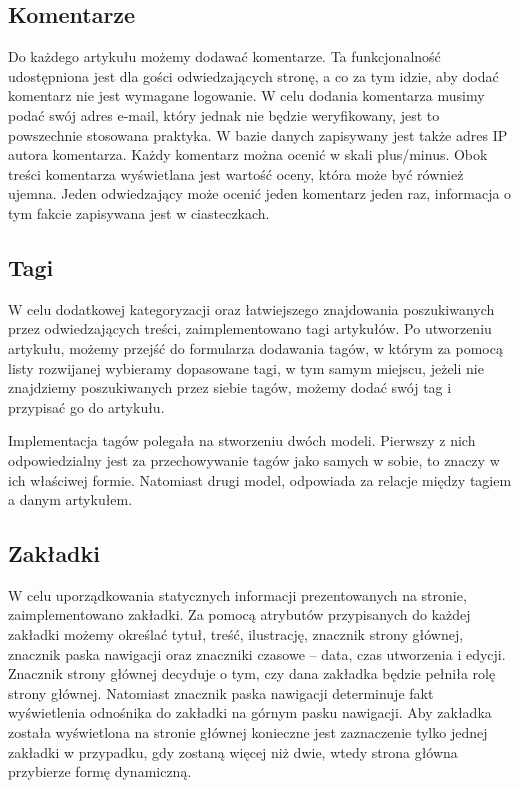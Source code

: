 \documentclass[openright]{xmgr}
\begin{document}
\subsection{Komentarze}
Do każdego artykułu możemy dodawać komentarze. Ta funkcjonalność udostępniona jest dla gości odwiedzających stronę, a co za tym idzie, aby dodać komentarz nie jest wymagane logowanie. W celu dodania komentarza musimy podać swój adres e-mail, który jednak nie będzie weryfikowany, jest to powszechnie stosowana praktyka. W bazie danych zapisywany jest także adres IP autora komentarza. Każdy komentarz można ocenić w skali plus/minus. Obok treści komentarza wyświetlana jest wartość oceny, która może być również ujemna. Jeden odwiedzający może ocenić jeden komentarz jeden raz, informacja o tym fakcie zapisywana jest w ciasteczkach.

\newpage

\subsection{Tagi}
W celu dodatkowej kategoryzacji oraz łatwiejszego znajdowania poszukiwanych przez odwiedzających treści, zaimplementowano tagi artykułów. Po utworzeniu artykułu, możemy przejść do formularza dodawania tagów, w którym za pomocą listy rozwijanej wybieramy dopasowane tagi, w tym samym miejscu, jeżeli nie znajdziemy poszukiwanych przez siebie tagów, możemy dodać swój tag i przypisać go do artykułu.

Implementacja tagów polegała na stworzeniu dwóch modeli. Pierwszy z nich odpowiedzialny jest za przechowywanie tagów jako samych w sobie, to znaczy w ich właściwej formie. Natomiast drugi model, odpowiada za relacje między tagiem a danym artykułem.

\subsection{Zakładki}
W celu uporządkowania statycznych informacji prezentowanych na stronie, zaimplementowano zakładki. Za pomocą atrybutów przypisanych do każdej zakładki możemy określać tytuł, treść, ilustrację, znacznik strony głównej, znacznik paska nawigacji oraz znaczniki czasowe – data, czas utworzenia i edycji. Znacznik strony głównej decyduje o tym, czy dana zakładka będzie pełniła rolę strony głównej. Natomiast znacznik paska nawigacji determinuje fakt wyświetlenia odnośnika do zakładki na górnym pasku nawigacji. Aby zakładka została wyświetlona na stronie głównej konieczne jest zaznaczenie tylko jednej zakładki w przypadku, gdy zostaną więcej niż dwie, wtedy strona główna przybierze formę dynamiczną.
\end{document}
